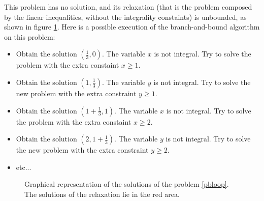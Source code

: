 \documentclass{article}
\begin{document}
This problem has no solution, and its relaxation (that is the problem composed
by the linear inequalities, without the integrality constaints) is unbounded, as
shown in figure \ref{bbloop}. Here is a possible execution of the
branch-and-bound algorithm on this problem:
\begin{itemize}
  \item Obtain the solution $(\frac{1}{3}, 0)$. The variable $x$ is not
    integral. Try to solve the problem with the extra constaint
    $x \geqslant 1$.
  \item Obtain the solution $(1, \frac{1}{3})$. The variable $y$ is not
    integral. Try to solve the new problem with the extra constraint $y
    \geqslant 1$.
  \item Obtain the solution $(1 + \frac{1}{3}, 1)$. The variable $x$ is not
    integral. Try to solve the problem with the extra constaint
    $x \geqslant 2$.
  \item Obtain the solution $(2, 1 + \frac{1}{3})$. The variable $y$ is not
    integral. Try to solve the new problem with the extra constraint $y
    \geqslant 2$.
  \item etc...
\end{itemize}


\begin{figure}[h]
  \centering


  \label{bbloop}
  \caption{Graphical representation of the solutions of the problem
           \ref{pbloop}. The solutions of the relaxation lie in the red area.}
\end{figure}
\end{document}
